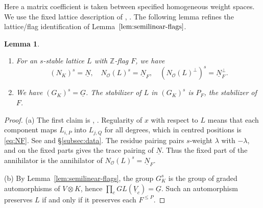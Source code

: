 \documentclass[11pt,reqno]{amsart}
\newtheorem{Lemma}[Theorem]{Lemma}
\theoremstyle{definition}
\theoremstyle{remark}
\def\bbZ{\mathbb Z}
\def\dN{\underline N}
\def\dG{\underline G}
\def\dV{\underline V}
\providecommand{\calO}{\mathcal O}
\begin{document}
Here a matrix coefficient is taken between specified homogeneous
weight spaces. We use the fixed lattice description of \cite{VV25}, \cite[\S2.4]{VVsh}.
The following lemma refines the lattice/flag identification of
Lemma~$\ref{lem:semilinear-flags}$.

\begin{Lemma}\label{lem:ns-lattice}\hfill
\begin{enumerate}[label=$\mathrm{(\alph*)}$,leftmargin=8mm]
\item For an $s$-stable lattice $L$ with $\bbZ$-flag $F$, we have
$$(N_K)^s=\dN,\quad N_\calO(L)^s=\dN_F,\quad (N_\calO(L)^\perp)^s=\dN_F^\perp.$$
\item We have $(G_K)^s=\dG$. The stabilizer of $L$ in $(G_K)^s$ is
$P_F$, the stabilizer of $F$.
\end{enumerate}
\end{Lemma}

\begin{proof}\hfill

(a) The first claim is \cite[\S2.4]{VVsh}, \cite{VV25}.
Regularity of $x$ with respect to $L$ means that each component maps
$L_{i,P}$ into $L_{j,Q}$ for all degrees, which in centred positions
is \eqref{eq:NF}. See \cite[(2.4.22)]{VVsh} and
\S\ref{subsec:data}. The residue pairing pairs $s$-weight $\lambda$
with $-\lambda$, and on the fixed parts gives the trace pairing
of $\dN$. Thus the fixed part of the annihilator is the
annihilator of $N_\calO(L)^s=\dN_F$.

(b) By Lemma~\ref{lem:semilinear-flags}, the group $G_K^s$ is the group
of graded automorphisms of $V\otimes K$, hence
$\prod_cGL(\dV_c)=\dG$. Such an automorphism preserves $L$ if and only if  it preserves each $F^{\leqslant P}$.
\end{proof}
\end{document}
